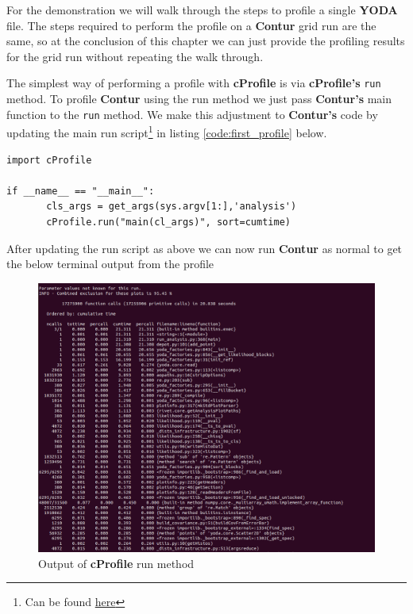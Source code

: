 For the demonstration we will walk through the steps to profile a single \textbf{YODA} file. The steps required to perform the profile on a \textbf{Contur} grid run are the same, so at the conclusion of this chapter we can just provide the profiling results for the grid run without repeating the walk through.

The simplest way of performing a profile with \textbf{cProfile} is via \textbf{cProfile's} \texttt{run} method. To profile \textbf{Contur} using the run method we just pass \textbf{Contur's} main function to the \texttt{run} method. We make this adjustment to \textbf{Contur's} code by updating the main run script\footnote{Can be found \href{https://gitlab.com/hepcedar/contur/-/blob/main/bin/contur}{here}} in listing \ref{code:first_profile} below.

\begin{code}
\label{code:first_profile}
\begin{verbatim}
import cProfile

if __name__ == "__main__":
       cls_args = get_args(sys.argv[1:],'analysis')
       cProfile.run("main(cl_args)", sort=cumtime)
\end{verbatim}
\end{code}


After updating the run script as above we can now run \textbf{Contur} as normal to get the below terminal output from the profile

\begin{figure}[H]
\centering
\includegraphics[scale=0.35]{plots/example_profile.png}
\caption{Output of \textbf{cProfile} run method}
\label{fig:ep}
\end{figure}

